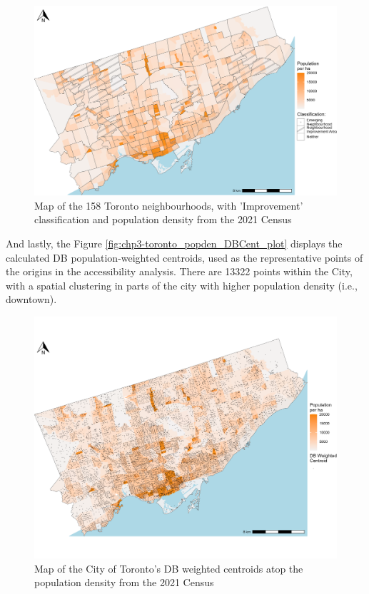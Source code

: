 \documentclass[
11pt, %
oneside, %
english, %
singlespacing, %
]{macthesis} %
\begin{document}
\begin{figure}

{\centering \includegraphics[width=6in]{./data/figures/chp3-toronto_popden_NIAs_plot} 

}

\caption{\label{fig:chp3-toronto_popden_NIAs_plot}Map of the 158 Toronto neighbourhoods, with 'Improvement' classification and population density from the 2021 Census}\label{fig:unnamed-chunk-44}
\end{figure}

And lastly, the Figure \ref{fig:chp3-toronto_popden_DBCent_plot} displays the calculated DB population-weighted centroids, used as the representative points of the origins in the accessibility analysis. There are 13322 points within the City, with a spatial clustering in parts of the city with higher population density (i.e., downtown).

\begin{figure}

{\centering \includegraphics[width=6in]{./data/figures/chp3-toronto_popden_DBCent_plot} 

}

\caption{\label{fig:chp3-toronto_popden_DBCent_plot}Map of the City of Toronto's DB weighted centroids atop the population density from the 2021 Census}\label{fig:unnamed-chunk-45}
\end{figure}
\end{document}
